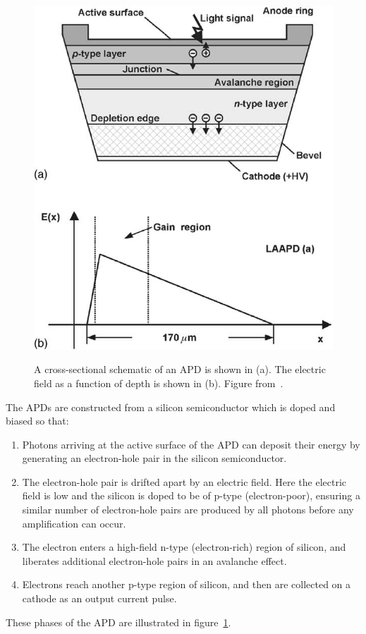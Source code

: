 \begin{figure}
\begin{center}
\includegraphics[keepaspectratio=true,width=\textwidth]{APDCrossSection.png}
\end{center}
\renewcommand{\baselinestretch}{1}
\small\normalsize
\begin{quote}
\caption{A cross-sectional schematic of an APD is shown in (a).  The electric field as a function of depth is shown in (b).  Figure from~\cite{Moszynski2002504}.}
\label{fig:APDCrossSection}
\end{quote}
\end{figure}
\renewcommand{\baselinestretch}{2}
\small\normalsize

The APDs are constructed from a silicon semiconductor which is doped and biased so that:~\cite{Moszynski2002504}
\begin{enumerate}
\item Photons arriving at the active surface of the APD can deposit their energy by generating an electron-hole pair in the silicon semiconductor.
\item The electron-hole pair is drifted apart by an electric field.  Here the electric field is low and the silicon is doped to be of p-type (electron-poor), ensuring a similar number of electron-hole pairs are produced by all photons before any amplification can occur.
\item The electron enters a high-field n-type (electron-rich) region of silicon, and liberates additional electron-hole pairs in an avalanche effect.
\item Electrons reach another p-type region of silicon, and then are collected on a cathode as an output current pulse.
\end{enumerate}
These phases of the APD are illustrated in figure~\ref{fig:APDCrossSection}.

